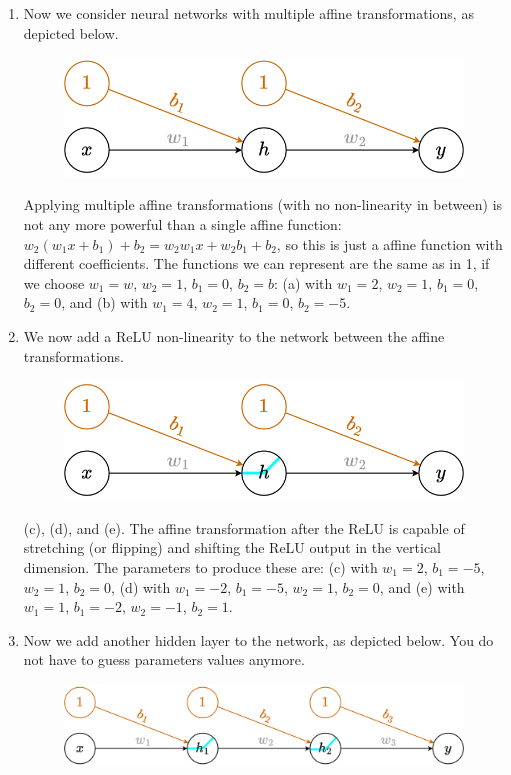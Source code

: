 \documentclass[11pt, a4paper]{article}
\begin{document}
\begin{enumerate}
    \item Now we consider neural networks with multiple affine transformations, as depicted below. 
    \begin{figure}[h!]
    \centering
    \includegraphics[width=.6\linewidth]{figures/doubleaffine.png}
\end{figure}

    \begin{solution}
        Applying multiple affine transformations (with no non-linearity in between) is not any more powerful than a single affine function: $w_2(w_1x + b_1) + b_2 = w_2w_1x + w_2b_1 + b_2$, so this is just a affine function with different coefficients. The functions we can represent are the same as in 1, if we choose $w_1 = w$, $w_2 = 1$, $b_1 = 0$, $b_2 = b$: (a) with $w_1 = 2$, $w_2 = 1$, $b_1 = 0$, $b_2 = 0$, and (b) with $w_1 = 4$, $w_2 = 1$, $b_1 = 0$, $b_2 = -5$.
    \end{solution}
    
    \item We now add a ReLU non-linearity to the network between the affine transformations.
    \begin{figure}[h!]
    \centering
    \includegraphics[width=.6\linewidth]{figures/onehidden.png}
\end{figure}

    \begin{solution}
        (c), (d), and (e). The affine transformation after the ReLU is capable of stretching (or flipping) and shifting the ReLU output in the vertical dimension. The parameters to produce these are: (c) with $w_1 = 2$, $b_1 = -5$, $w_2 = 1$, $b_2 = 0$, (d) with $w_1 = -2$, $b_1 = -5$, $w_2 = 1$, $b_2 = 0$, and (e) with $w_1 = 1$, $b_1 = -2$, $w_2 = -1$, $b_2 = 1$.
    \end{solution}
    
    \item Now we add another hidden layer to the network, as depicted below. You do not have to guess parameters values anymore.
    \begin{figure}[h!]
    \centering
    \includegraphics[width=.8\linewidth]{figures/twolhidden.png}
\end{figure}


\end{enumerate}
\end{document}
